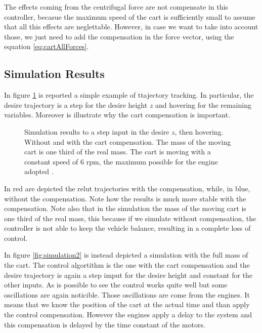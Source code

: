 \noindent The effects coming from the centrifugal force are not compensate in this controller, becasue the maximum speed of the cart is sufficiently small to assume that all this effects are neglettable. However, in case we want to take into account those, we just need to add the compensation in the force vector, using the equation \eqref{eq:cartAllForces}.

\subsection{Simulation Results}

In figure \ref{fig:simulation1} is reported a simple example of ttajectory tracking. In particular, the desire trajectory is a step for the desire height $z$ and hovering for the remaining variables. Moreover is illustrate why the cart compensation is important. 

\begin{figure}[h]
	\centering
 	
 	\caption{Simulation results to a step input in the desire $z$, then hovering. Without and with the cart compensation. The mass of the moving cart is one third of the real mass. The cart is moving with a constant speed of $6$ rpm, the maximum possible for the engine adopted \cite{Carlos}.}
 	\label{fig:simulation1}		
\end{figure}

\noindent In red are depicted the relut trajectories with the compensation, while, in blue, without the compensation. Note how the results is much more stable with the compensation. Note also that in the simulation the mass of the moving cart is one third of the real mass, this because if we simulate without compensation, the controller is not able to keep the vehicle balance, resulting in a complete loss of control. 

\noindent In figure \ref{fig:simulation2} is instead depicted a simulation with the full mass of the cart. The control algortithm is the one with the cart compensation and the desire trajectory is again a step imput for the desire height and constant for the other inputs. As is possible to see the control works quite well but some oscillations are again noticible. Those oscillations are come from the engines. It means that we know the position of the cart at the actual time and than apply the control compensation. However the engines apply a delay to the system and this compensation is delayed by the time constant of the motors. 

